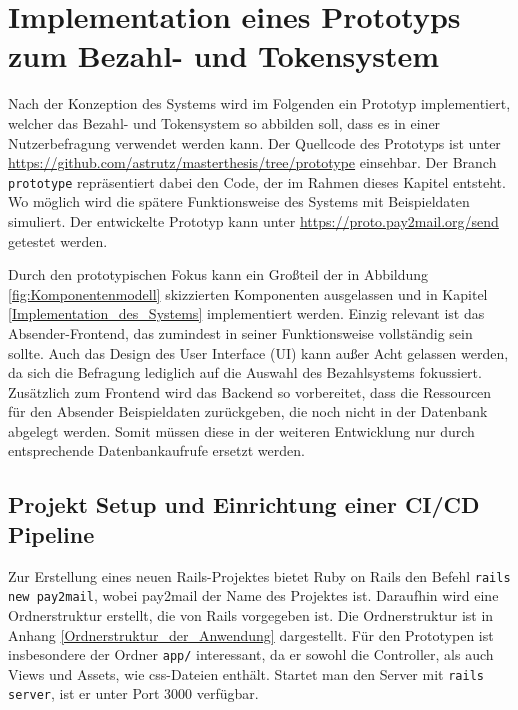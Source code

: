 
\chapter{Implementation eines Prototyps zum Bezahl- und Tokensystem}
\label{Implementation_eines_Prototyps_zum Bezahl-_und_Tokensystem}

Nach der Konzeption des Systems wird im Folgenden ein Prototyp implementiert, welcher das Bezahl- und Tokensystem so abbilden soll, dass es in einer Nutzerbefragung verwendet werden kann.  Der Quellcode des Prototyps ist unter \url{https://github.com/astrutz/masterthesis/tree/prototype} einsehbar. Der Branch \texttt{prototype} repräsentiert dabei den Code, der im Rahmen dieses Kapitel entsteht.
 Wo möglich wird die spätere Funktionsweise des Systems mit Beispieldaten simuliert. Der entwickelte Prototyp kann unter \url{https://proto.pay2mail.org/send} getestet werden. 
 
Durch den prototypischen Fokus kann ein Großteil der in Abbildung \ref{fig:Komponentenmodell} skizzierten Komponenten ausgelassen und in Kapitel \ref{Implementation_des_Systems} implementiert werden. Einzig relevant ist das Absender-Frontend, das zumindest in seiner Funktionsweise vollständig sein sollte. Auch das Design des User Interface (UI) kann außer Acht gelassen werden, da sich die Befragung lediglich auf die Auswahl des Bezahlsystems fokussiert. Zusätzlich zum Frontend wird das Backend so vorbereitet, dass die Ressourcen für den Absender Beispieldaten zurückgeben, die noch nicht in der Datenbank abgelegt werden. Somit müssen diese in der weiteren Entwicklung nur durch entsprechende Datenbankaufrufe ersetzt werden.

\section{Projekt Setup und Einrichtung einer CI/CD Pipeline}
\label{Projekt_Setup_und_Einrichtung_einer_CI/CD Pipeline}

Zur Erstellung eines neuen Rails-Projektes bietet Ruby on Rails den Befehl \texttt{rails new pay2mail}, wobei pay2mail der Name des Projektes ist. Daraufhin wird eine Ordnerstruktur erstellt, die von Rails vorgegeben ist. Die Ordnerstruktur ist in Anhang \ref{Ordnerstruktur_der_Anwendung} dargestellt. Für den Prototypen ist insbesondere der Ordner \texttt{app/} interessant, da er sowohl die Controller, als auch Views und Assets, wie css-Dateien enthält. Startet man den Server mit \texttt{rails server}, ist er unter Port 3000 verfügbar.

